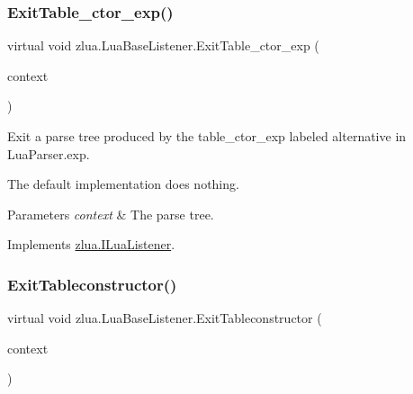\subsubsection{\texorpdfstring{Exit\+Table\+\_\+ctor\+\_\+exp()}{ExitTable\_ctor\_exp()}}
{\footnotesize\ttfamily virtual void zlua.\+Lua\+Base\+Listener.\+Exit\+Table\+\_\+ctor\+\_\+exp (\begin{DoxyParamCaption}\item[{\mbox{[}\+Not\+Null\mbox{]} \mbox{\hyperlink{classzlua_1_1_lua_parser_1_1_table__ctor__exp_context}{Lua\+Parser.\+Table\+\_\+ctor\+\_\+exp\+Context}}}]{context }\end{DoxyParamCaption})\hspace{0.3cm}{\ttfamily [virtual]}}



Exit a parse tree produced by the {\ttfamily table\+\_\+ctor\+\_\+exp} labeled alternative in Lua\+Parser.\+exp. 

The default implementation does nothing.


\begin{DoxyParams}{Parameters}
{\em context} & The parse tree.\\
\hline
\end{DoxyParams}


Implements \mbox{\hyperlink{interfacezlua_1_1_i_lua_listener_a30a4acd429120b15838dc24ddb201fc6}{zlua.\+I\+Lua\+Listener}}.

\mbox{\label{classzlua_1_1_lua_base_listener_aa0a2a4e40e4246abaddc0bbe731748c6}} 
\subsubsection{\texorpdfstring{Exit\+Tableconstructor()}{ExitTableconstructor()}}
{\footnotesize\ttfamily virtual void zlua.\+Lua\+Base\+Listener.\+Exit\+Tableconstructor (\begin{DoxyParamCaption}\item[{\mbox{[}\+Not\+Null\mbox{]} \mbox{\hyperlink{classzlua_1_1_lua_parser_1_1_tableconstructor_context}{Lua\+Parser.\+Tableconstructor\+Context}}}]{context }\end{DoxyParamCaption})\hspace{0.3cm}{\ttfamily [virtual]}}



